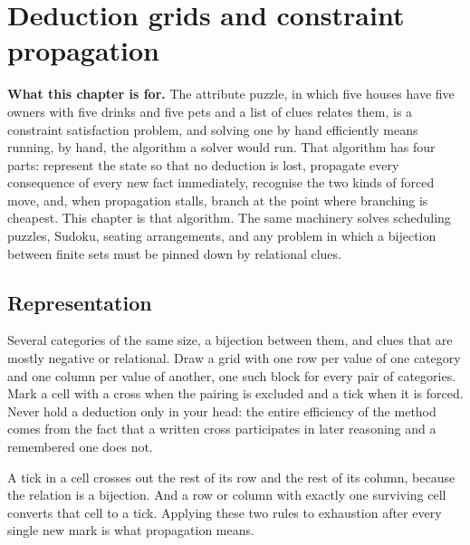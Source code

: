 \chapter{Deduction grids and constraint propagation}

\begin{orient}
\textbf{What this chapter is for.} The attribute puzzle, in which five houses have five owners with five drinks and five pets and a list of clues relates them, is a constraint satisfaction problem, and solving one by hand efficiently means running, by hand, the algorithm a solver would run. That algorithm has four parts: represent the state so that no deduction is lost, propagate every consequence of every new fact immediately, recognise the two kinds of forced move, and, when propagation stalls, branch at the point where branching is cheapest. This chapter is that algorithm. The same machinery solves scheduling puzzles, Sudoku, seating arrangements, and any problem in which a bijection between finite sets must be pinned down by relational clues.
\end{orient}

\section{Representation}

\cue Several categories of the same size, a bijection between them, and clues that are mostly negative or relational.
\method Draw a grid with one row per value of one category and one column per value of another, one such block for every pair of categories. Mark a cell with a cross when the pairing is excluded and a tick when it is forced. Never hold a deduction only in your head: the entire efficiency of the method comes from the fact that a written cross participates in later reasoning and a remembered one does not.

\begin{keynote}
A tick in a cell crosses out the rest of its row and the rest of its column, because the relation is a bijection. And a row or column with exactly one surviving cell converts that cell to a tick. Applying these two rules to exhaustion after every single new mark is what propagation means.
\end{keynote}

\begin{center}
\end{center}

